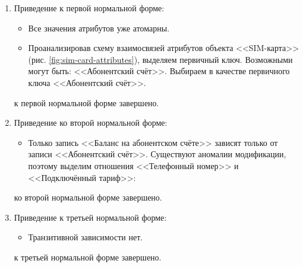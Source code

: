 \begin{enumerate}
    \item Приведение к первой нормальной форме:
    \begin{itemize}
        \item Все значения атрибутов уже атомарны.
        \item Проанализировав схему взаимосвязей атрибутов объекта <<SIM-карта>> (рис. \ref{fig:sim-card-attributes}), выделяем первичный ключ. Возможными могут быть: <<Абонентский счёт>>. Выбираем в качестве первичного ключа <<Абонентский счёт>>.
    \end{itemize}
    \tab{} к первой нормальной форме завершено.

    \item Приведение ко второй нормальной форме:
    \begin{itemize}
        \item Только запись <<Баланс на абонентском счёте>> зависят только от записи <<Абонентский счёт>>. Существуют аномалии модификации, поэтому выделим отношения <<Телефонный номер>> и <<Подключённый тариф>>:
    \end{itemize}
    \tab{} ко второй нормальной форме завершено.

    \item Приведение к третьей нормальной форме:
    \begin{itemize}
        \item Транзитивной зависимости нет.
    \end{itemize}
    \tab{} к третьей нормальной форме завершено.
\end{enumerate}